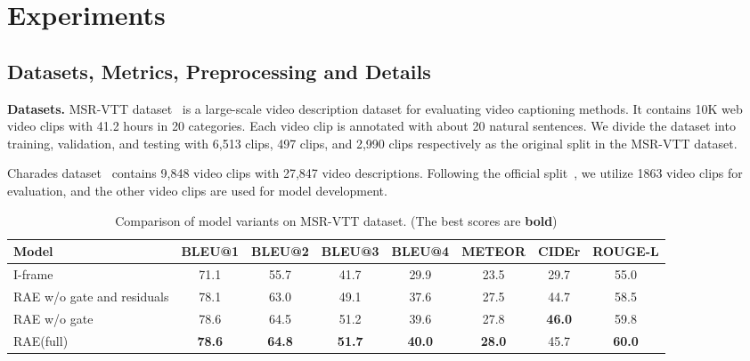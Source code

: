 \documentclass[a4paper,conference]{IEEEtran}
\begin{document}
\section{Experiments}
\subsection{Datasets, Metrics, Preprocessing and Details}
\noindent\textbf{Datasets.}
{MSR-VTT dataset}~\cite{xu2016msr} is a large-scale video description dataset for evaluating video captioning methods.
It contains 10K web video clips with 41.2 hours in 20 categories. Each video
clip is annotated with about 20 natural sentences. We divide the dataset into training, validation, and testing with 6,513 clips, 497 clips, and 2,990 clips respectively as the original split in the MSR-VTT dataset.

{Charades dataset}~\cite{sigurdsson2016hollywood}  contains 9,848 video clips with 27,847 video descriptions.  Following the official split~\cite{sigurdsson2016hollywood}, we utilize 1863 video clips for evaluation, and the other video clips are used for model development.


\begin{table*}[htb]
    \normalsize
	\centering
	\caption{Comparison of model variants on MSR-VTT dataset. (The best scores are \textbf{bold})}
	\begin{tabular}{l|c|c|c|c|c|c|c}
		\hline
		{Model} & BLEU@1 & BLEU@2 & BLEU@3 & BLEU@4 & METEOR & CIDEr & ROUGE-L\\ 
		\hline
		{I-frame} &71.1 &55.7 &41.7  &29.9 &23.5 &29.7 &55.0 \\
		\hline
        {RAE w/o gate and residuals} &78.1 &63.0 &49.1 &{37.6} &{27.5}  &{44.7} &{58.5} \\
 		\hline
		{{RAE w/o gate}}  &78.6 &64.5 &51.2 &39.6 &27.8 &\textbf{46.0} &59.8 \\
		\hline
		{{RAE(full)}}  &\textbf{78.6} &\textbf{64.8} &\textbf{51.7}   &\textbf{40.0} & \textbf{28.0} & {45.7} & \textbf{60.0}\\
		\hline
	\end{tabular}%
	\label{tab:model varient msrvtt}%

\end{table*}%
\end{document}
